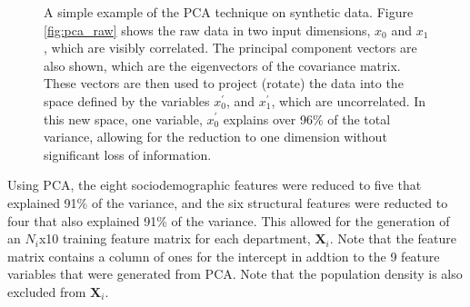 \documentclass{svjour3}
\begin{document}
    \begin{figure}[!htb]
       \begin{center}
      \end{center}
      \caption{A simple example of the PCA technique on synthetic data. Figure \protect\ref{fig:pca_raw} shows the raw data in two input dimensions, $x_0$ and $x_1$, which are visibly correlated. The principal component vectors are also shown, which are the eigenvectors of the covariance matrix. These vectors are then used to project (rotate) the data into the space defined by the variables $x_0^\prime$, and $x_1^\prime$, which are uncorrelated. In this new space, one variable, $x_0^\prime$ explains over 96\% of the total variance, allowing for the reduction to one dimension without significant loss of information.}
     \label{fig:pca}
  \end{figure}
  
  Using PCA, the eight sociodemographic features were reduced to five that explained 91\% of the variance, and the six structural features were reducted to four that also explained 91\% of the variance. This allowed for the generation of an $N_i$x10 training feature matrix for each department, $\textbf{X}_i$. Note that the feature matrix contains a column of ones for the intercept in addtion to the 9 feature variables that were generated from PCA. Note that the population density is also excluded from $\textbf{X}_i$. 
  
\end{document}
